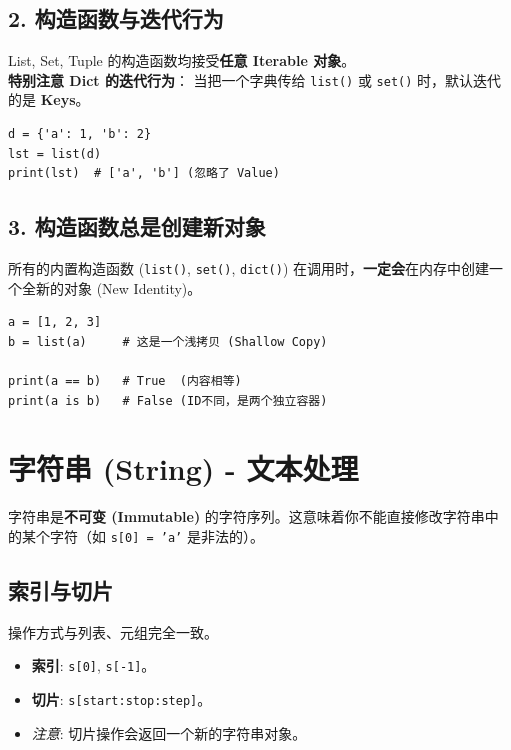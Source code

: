 \documentclass[12pt, a4paper]{article}
\begin{document}
\subsection{2. 构造函数与迭代行为}

List, Set, Tuple 的构造函数均接受\textbf{任意 Iterable 对象}。
\\ \textbf{特别注意 Dict 的迭代行为}：
当把一个字典传给 \texttt{list()} 或 \texttt{set()} 时，默认迭代的是 \textbf{Keys}。

\begin{lstlisting}[caption={字典转列表}]
d = {'a': 1, 'b': 2}
lst = list(d)
print(lst)  # ['a', 'b'] (忽略了 Value)
\end{lstlisting}

\subsection{3. 构造函数总是创建新对象}

所有的内置构造函数 (\texttt{list()}, \texttt{set()}, \texttt{dict()}) 在调用时，\textbf{一定会}在内存中创建一个全新的对象 (New Identity)。

\begin{lstlisting}
a = [1, 2, 3]
b = list(a)     # 这是一个浅拷贝 (Shallow Copy)

print(a == b)   # True  (内容相等)
print(a is b)   # False (ID不同，是两个独立容器)
\end{lstlisting}

\section{字符串 (String) - 文本处理}

字符串是\textbf{不可变 (Immutable)} 的字符序列。这意味着你不能直接修改字符串中的某个字符（如 \texttt{s[0] = 'a'} 是非法的）。

\subsection{索引与切片}

操作方式与列表、元组完全一致。
\begin{itemize}
    \item \textbf{索引}: \texttt{s[0]}, \texttt{s[-1]}。
    \item \textbf{切片}: \texttt{s[start:stop:step]}。
    \item \textit{注意}: 切片操作会返回一个新的字符串对象。
\end{itemize}
\end{document}
